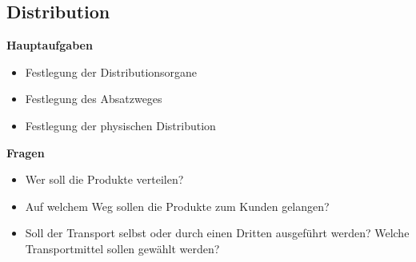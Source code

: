 \documentclass[../ZF_Wing.tex]{subfiles}
\begin{document}
\subsection{Distribution}
\begin{multicols}{2}
\textbf{Hauptaufgaben\\}
\begin{itemize}
	\item \colorbox{pink!30}{Festlegung der Distributionsorgane}
	\item Festlegung des Absatzweges
	\item \colorbox{blue!30}{Festlegung der physischen Distribution}
\end{itemize}

\columnbreak

\textbf{Fragen\\}
\begin{itemize}
	\item \colorbox{pink!30}{Wer soll die Produkte verteilen?}
	\item Auf welchem Weg sollen die Produkte zum Kunden gelangen?
	\item \colorbox{blue!30}{Soll der Transport selbst oder durch einen Dritten ausgeführt werden? Welche Transportmittel sollen gewählt werden?}
\end{itemize}




\end{multicols}

\pagebreak
\end{document}

